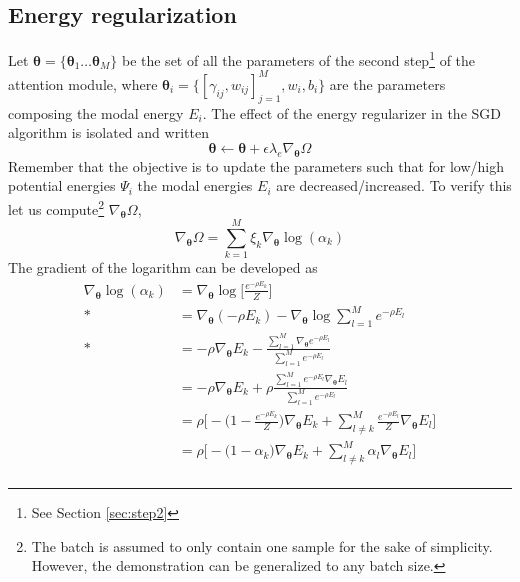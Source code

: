 \subsection*{Energy regularization}
Let $\bm{\theta} = \{\bm{\theta}_1\ldots\bm{\theta}_M\}$ be the set of all the parameters of the second step\footnote{See Section \ref{sec:step2}} of the attention module, where $\bm{\theta}_i = \{[\gamma_{ij}, w_{ij}]_{j=1}^M, w_i, b_i\}$ are the parameters composing the modal energy $E_i$. The effect of the energy regularizer in the SGD algorithm is isolated and written
\begin{equation}
\bm{\theta} \leftarrow \bm{\theta} + \epsilon\lambda_e\nabla_{\bm{\theta}}\Omega
\label{eq:update}
\end{equation}
Remember that the objective is to update the parameters such that for low/high potential energies $\Psi_i$ the modal energies $E_i$ are decreased/increased. To verify this let us compute\footnote{The batch is assumed to only contain one sample for the sake of simplicity. However, the demonstration can be generalized to any batch size.} $\nabla_{\bm{\theta}}\Omega$,
\begin{equation}
\nabla_{\bm{\theta}} \Omega =\sum_{k=1}^M \xi_k \nabla_{\bm{\theta}} \log(\alpha_k) 
\label{eq:dev}
\end{equation}
The gradient of the logarithm can be developed as
\begingroup
\allowdisplaybreaks
\begin{align*}
\nabla_{\bm{\theta}}  \log(\alpha_k) &= \nabla_{\bm{\theta}} \log \bigg[ \frac{e^{-\rho E_k}}{Z} \bigg] \\*
&=  \nabla_{\bm{\theta}}(-\rho E_k) -  \nabla_{\bm{\theta}} \log \sum_{l=1}^M e^{-\rho E_l} \\*
&=  -\rho \nabla_{\bm{\theta}}E_k - \frac{\sum_{l=1}^M \nabla_{\bm{\theta}} e^{-\rho E_l}}{\sum_{l=1}^M e^{-\rho E_l}} \\
&= -\rho \nabla_{\bm{\theta}}E_k + \rho \frac{\sum_{l=1}^M e^{-\rho E_l} \nabla_{\bm{\theta}}E_l}{\sum_{l=1}^M e^{-\rho E_l}} \\
&= \rho \Bigg[ -\big(1 - \frac{e^{-\rho E_k}}{Z}\big)\nabla_{\bm{\theta}}E_k + \sum_{l \neq k}^M \frac{e^{-\rho E_l}}{Z} \nabla_{\bm{\theta}}E_l \Bigg] \\
&= \rho \Bigg[ -\big(1 - \alpha_k\big)\nabla_{\bm{\theta}}E_k + \sum_{l \neq k}^M \alpha_l \nabla_{\bm{\theta}}E_l \Bigg] \\
\label{eq:grad-log}
\end{align*}
\endgroup

